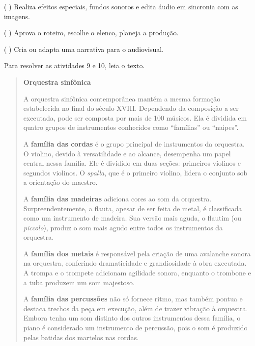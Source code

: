 (  ) Realiza efeitos especiais, fundos sonoros e edita áudio em sincronia com as imagens.

(  ) Aprova o roteiro, escolhe o elenco, planeja a produção.

(  ) Cria ou adapta uma narrativa para o audiovisual.

Para resolver as atividades 9 e 10, leia o texto.

\begin{quote}
\textbf{Orquestra sinfônica}

A orquestra sinfônica contemporânea mantém a mesma formação 
estabelecida no final do século XVIII. Dependendo da composição 
a ser executada, pode ser composta por mais de 100 músicos. Ela 
é dividida em quatro grupos de instrumentos conhecidos como ``famílias'' 
ou ``naipes''.

A \textbf{família das cordas} é o grupo principal de instrumentos 
da orquestra. O violino, devido à versatilidade e ao alcance, desempenha 
um papel central nessa família. Ele é dividido em duas seções: primeiros 
violinos e segundos violinos. O \textit{spalla}, que é o primeiro violino, 
lidera o conjunto sob a orientação do maestro.

A \textbf{família das madeiras} adiciona cores ao som da orquestra. 
Surpreendentemente, a flauta, apesar de ser feita de metal, é classificada 
como um instrumento de madeira. Sua versão mais aguda, o flautim (ou 
\textit{piccolo}), produz o som mais agudo entre todos os instrumentos da 
orquestra.

A \textbf{família dos metais} é responsável pela criação de uma avalanche 
sonora na orquestra, conferindo dramaticidade e grandiosidade à obra executada. 
A trompa e o trompete adicionam agilidade sonora, enquanto o trombone e a tuba 
produzem um som majestoso.

A \textbf{família das percussões} não só fornece ritmo, mas também pontua e destaca 
trechos da peça em execução, além de trazer vibração à orquestra. Embora tenha um 
som distinto dos outros instrumentos dessa família, o piano é considerado um 
instrumento de percussão, pois o som é produzido pelas batidas dos martelos nas 
cordas.

\end{quote}

